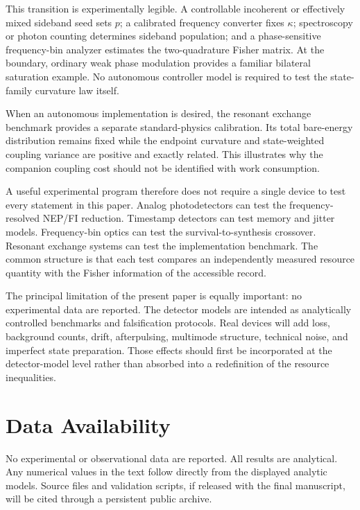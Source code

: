 \documentclass[aps,pra,reprint,superscriptaddress,longbibliography]{revtex4-2}
\begin{document}
This transition is experimentally legible. A controllable incoherent or effectively mixed sideband seed sets $p$; a calibrated frequency converter fixes $\kappa$; spectroscopy or photon counting determines sideband population; and a phase-sensitive frequency-bin analyzer estimates the two-quadrature Fisher matrix. At the boundary, ordinary weak phase modulation provides a familiar bilateral saturation example. No autonomous controller model is required to test the state-family curvature law itself.

When an autonomous implementation is desired, the resonant exchange benchmark provides a separate standard-physics calibration. Its total bare-energy distribution remains fixed while the endpoint curvature and state-weighted coupling variance are positive and exactly related. This illustrates why the companion coupling cost should not be identified with work consumption.

A useful experimental program therefore does not require a single device to test every statement in this paper. Analog photodetectors can test the frequency-resolved NEP/FI reduction. Timestamp detectors can test memory and jitter models. Frequency-bin optics can test the survival-to-synthesis crossover. Resonant exchange systems can test the implementation benchmark. The common structure is that each test compares an independently measured resource quantity with the Fisher information of the accessible record.

The principal limitation of the present paper is equally important: no experimental data are reported. The detector models are intended as analytically controlled benchmarks and falsification protocols. Real devices will add loss, background counts, drift, afterpulsing, multimode structure, technical noise, and imperfect state preparation. Those effects should first be incorporated at the detector-model level rather than absorbed into a redefinition of the resource inequalities.

\section*{Data Availability}

No experimental or observational data are reported. All results are analytical. Any numerical values in the text follow directly from the displayed analytic models. Source files and validation scripts, if released with the final manuscript, will be cited through a persistent public archive.
\end{document}

